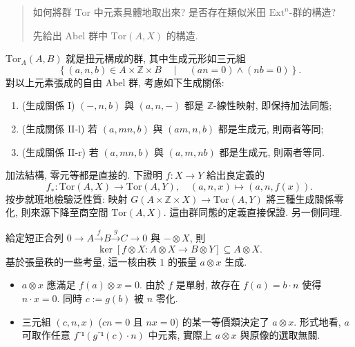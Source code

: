 \begin{abstract}
    如何將群 $\mathrm{Tor}$ 中元素具體地取出來? 是否存在類似米田 $\mathrm{Ext}^n$-群的構造? 

先給出 Abel 群中 $\mathrm{Tor}(A, X)$ 的構造. 
\end{abstract}

\begin{example}
    $\mathrm{Tor}_A(A, B)$ 就是扭元構成的群, 其中生成元形如三元組
    \begin{equation}
        \left\{(a, n, b) ∈ A × ℤ × B \quad ∣ \quad (an = 0) ∧ (nb = 0)\right\}. 
    \end{equation} 
    對以上元素張成的自由 Abel 群, 考慮如下生成關係:  
    \begin{enumerate}
        \item (生成關係 I) $(-, n, b)$ 與 $(a, n, -)$ 都是 $ℤ$-線性映射, 即保持加法同態; 
        \item (生成關係 II-l) 若 $(a, mn, b)$ 與 $(am, n, b)$ 都是生成元, 則兩者等同; 
        \item (生成關係 II-r) 若 $(a, mn, b)$ 與 $(a, m, nb)$ 都是生成元, 則兩者等同.
    \end{enumerate}
\end{example}

\begin{example}
    加法結構, 零元等都是直接的. 下證明 $f : X → Y$ 給出良定義的
    \begin{equation}
        f_∗ : \mathrm{Tor}(A, X) → \mathrm{Tor}(A, Y),\quad (a, n, x) ↦ (a, n, f(x)). 
    \end{equation}
    按步就班地檢驗泛性質: 映射 $G(A × ℤ × X) → \mathrm{Tor}(A, Y)$ 將三種生成關係零化, 則來源下降至商空間 $\mathrm{Tor}(A, X)$. 這由群同態的定義直接保證.  另一側同理. 
\end{example}

\begin{example}
     給定短正合列 $0 → A \overset f→ B \overset g→ C → 0$ 與 $-⊗X$, 則
    \begin{equation}
        \ker [f ⊗ X : A ⊗ X → B ⊗ Y] ⊆ A ⊗ X. 
    \end{equation}
    基於張量秩的一些考量, 這一核由秩 $1$ 的張量 $a ⊗ x$ 生成. 
    \begin{itemize}
        \item $a ⊗ x$ 應滿足 $f(a) ⊗ x = 0$. 由於 $f$ 是單射, 故存在 $f(a) = b ⋅ n$ 使得 $n ⋅ x = 0$. 同時 $c := g(b)$ 被 $n$ 零化. 
        \item 三元組 $(c,n,x)$ ($cn = 0$ 且 $nx = 0$) 的某一等價類決定了 $a ⊗ x$. 形式地看, $a$ 可取作任意 $f⁻¹ (g⁻¹ (c) ⋅ n)$ 中元素, 實際上 $a ⊗ x$ 與原像的選取無關. 
    \end{itemize}
\end{example}

